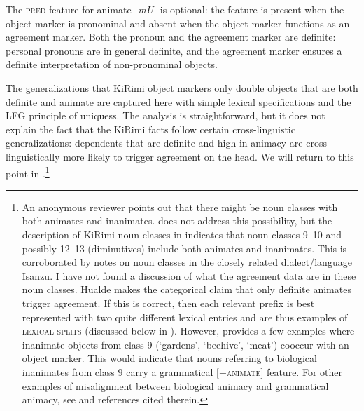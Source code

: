 \documentclass[output=paper,hidelinks]{langscibook}
\begin{document}
  
 \ea  \label{kirimi3}
\z

  \noindent  The \textsc{pred} feature for animate \textit{-mU-}   is  optional:  the feature is  present  when  the object marker is  pronominal and absent  when the  object marker  functions as an agreement marker. Both the pronoun and  the agreement marker are definite:    personal pronouns  are in general  definite,  and  the agreement  marker  ensures a definite interpretation of non-pronominal  objects.
  
  The generalizations that KiRimi object markers only double objects that are both definite and animate are captured here with simple lexical specifications  and   the  LFG principle of uniquess. The analysis is straightforward, but it does not explain the fact that the  KiRimi  facts follow certain cross-linguistic generalizations: dependents that are definite and high in  animacy are cross-linguistically more likely to trigger agreement on the head.  We will return to this point in .\footnote{An anonymous reviewer points out that   there might be noun classes with both animates and inanimates.    \citet{hualde89} does not address this possibility, but  the description of KiRimi noun classes in \citet{olson64} indicates that noun classes 9--10 and possibly  12--13 (diminutives) include both animates and inanimates. This is corroborated by    notes on noun classes in the closely related dialect/language Isanzu. I have not found a discussion of what the agreement data are in these noun classes. Hualde  makes the categorical claim  that only definite animates trigger agreement. If this is correct, then each relevant prefix is best represented with two quite different lexical entries and are thus   examples of \textsc{lexical splits}  (discussed below in ).  However, \citet[171]{olson64} provides a few examples where  inanimate objects from class 9  (`gardens', `beehive', `meat')   cooccur with an object marker.   This would indicate  that nouns referring to biological  inanimates from class 9   carry   a grammatical $[$$+$\textsc{animate}$]$ feature. For other  examples  of misalignment between biological animacy and  grammatical animacy, see  \citet{BayanatiToivonen19} and references cited therein.  } 
  
\end{document}
